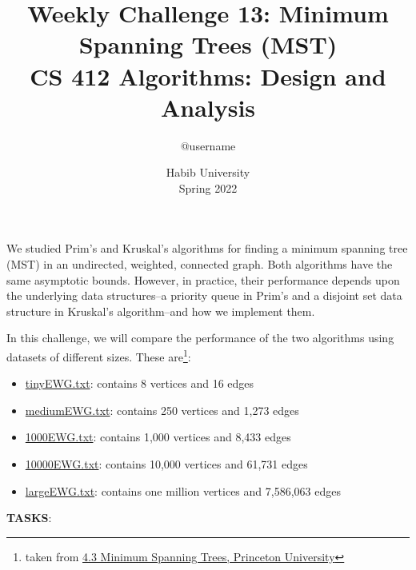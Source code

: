 \documentclass[a4paper]{exam}
\title{Weekly Challenge 13: Minimum Spanning Trees (MST)\\CS 412 Algorithms: Design and Analysis}
\author{@username}  %
\date{Habib University\\Spring 2022}
\begin{document}
\maketitle

\begin{questions}
  
\question[2]
We studied Prim's and Kruskal's algorithms for finding a minimum spanning tree (MST) in an undirected, weighted, connected graph. Both algorithms have the same asymptotic bounds. However, in practice, their performance depends upon the underlying data structures--a priority queue in Prim's and a disjoint set data structure in Kruskal's algorithm--and how we implement them. 

In this challenge, we will compare the performance of the two algorithms using datasets of different sizes. These are\footnote{taken from \href{https://algs4.cs.princeton.edu/43mst/}{4.3 Minimum Spanning Trees, Princeton University}}:
\begin{itemize}
\item \href{https://algs4.cs.princeton.edu/43mst/tinyEWG.txt}{tinyEWG.txt}: contains 8 vertices and 16 edges
\item \href{https://algs4.cs.princeton.edu/43mst/mediumEWG.txt}{mediumEWG.txt}: contains 250 vertices and 1,273 edges
\item \href{https://algs4.cs.princeton.edu/43mst/1000EWG.txt}{1000EWG.txt}: contains 1,000 vertices and 8,433 edges
\item \href{https://algs4.cs.princeton.edu/43mst/10000EWG.txt}{10000EWG.txt}: contains 10,000 vertices and 61,731 edges
\item \href{https://algs4.cs.princeton.edu/43mst/largeEWG.txt}{largeEWG.txt}: contains one million vertices and 7,586,063 edges
\end{itemize}

  \textbf{TASKS}:
\end{questions}
\end{document}
